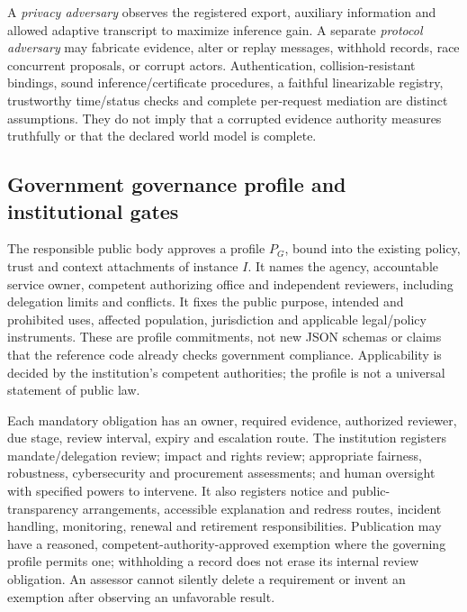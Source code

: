 A \emph{privacy adversary} observes the registered export, auxiliary information
and allowed adaptive transcript to maximize inference gain. A separate
\emph{protocol adversary} may fabricate evidence, alter or replay messages,
withhold records, race concurrent proposals, or corrupt actors. Authentication,
collision-resistant bindings, sound inference/certificate procedures, a
faithful linearizable registry, trustworthy time/status checks and complete
per-request mediation are distinct assumptions. They do not imply that a
corrupted evidence authority measures truthfully or that the declared world
model is complete.

\subsection{Government governance profile and institutional gates}
\label{sec:gov-profile}
The responsible public body approves a profile $P_G$, bound into the existing
policy, trust and context attachments of instance $I$. It names the agency,
accountable service owner, competent authorizing office and independent
reviewers, including delegation limits and conflicts. It fixes the public
purpose, intended and prohibited uses, affected population, jurisdiction and
applicable legal/policy instruments. These are profile commitments, not new
JSON schemas or claims that the reference code already checks government
compliance. Applicability is decided by the institution's competent authorities;
the profile is not a universal statement of public law.

Each mandatory obligation has an owner, required evidence, authorized reviewer,
due stage, review interval, expiry and escalation route. The institution
registers mandate/delegation review; impact and rights review; appropriate
fairness, robustness, cybersecurity and procurement assessments; and human
oversight with specified powers to intervene. It also registers notice and
public-transparency arrangements, accessible explanation and redress routes,
incident handling, monitoring, renewal and retirement responsibilities.
Publication may have a reasoned, competent-authority-approved exemption where
the governing profile permits one; withholding a record does not erase its
internal review obligation. An assessor cannot silently delete a requirement
or invent an exemption after observing an unfavorable result.

